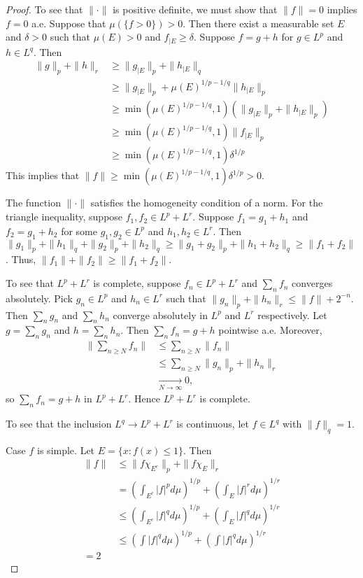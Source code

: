 \documentclass{article}
\begin{document}
\begin{proof}
To see that $\|\cdot\|$ is positive definite, we must show that $\|f\| = 0$ implies $f = 0$ a.e.  Suppose that $\mu(\{f > 0\}) > 0$.  Then there exist a measurable set $E$ and $\delta > 0$ such that $\mu(E) > 0$ and $f_{|E} \ge \delta$. Suppose $f = g + h$ for $g \in L^p$ and $h \in L^q$.  Then 
\begin{align*}
\|g\|_p + \|h\|_r &  \ge \|g_{|E}\|_p + \|h_{|E}\|_q 
\\ &  \ge \|g_{|E}\|_p + \mu(E)^{1/p - 1/q}\|h_{|E}\|_p
\\ & \ge \min(\mu(E)^{1/p - 1/q},1) (\|g_{|E}\|_p + \|h_{|E}\|_p)
\\ & \ge \min(\mu(E)^{1/p - 1/q},1) \|f_{|E}\|_p
\\  & \ge \min(\mu(E)^{1/p - 1/q},1) \delta^{1/p}
\end{align*}
This implies that $\|f\| \ge \min(\mu(E)^{1/p - 1/q},1) \delta^{1/p} > 0$.

The function $\|\cdot\|$ satisfies the homogeneity condition of a norm.  For the triangle inequality, suppose $f_1, f_2 \in L^p + L^r$.  Suppose $f_1 = g_1 + h_1$ and $f_2 = g_1 + h_2$ for some $g_1,g_2 \in L^p$ and $h_1, h_2 \in L^r$. Then $\|g_1\|_p + \|h_1\|_q +  \|g_2\|_p + \|h_2\|_q \ge \|g_1 + g_2\|_p + \|h_1 + h_2\|_q \ge \|f_1 +f_2\|$.  Thus, $\|f_1\| + \|f_2\| \ge \|f_1 + f_2\|$.

To see that $L^p + L^r$ is complete, suppose $f_n \in L^p + L^r$ and $\sum_n f_n$ converges absolutely. Pick $g_n \in L^p$ and $h_n \in L^r$ such that $\|g_n\|_p + \|h_n\|_r \le \|f\| + 2^{-n}$.  Then $\sum_n g_n$ and $\sum_n h_n$ converge absolutely in $L^p$ and $L^r$ respectively.  Let $g = \sum_n g_n$ and $h = \sum_n h_n$. Then $\sum_n f_n = g + h$ pointwise a.e.  Moreover, 
\begin{align*}
\| \sum_{n \ge N} f_n \|  & \le \sum_{n \ge N} \|f_n\|
\\ & \le \sum_{n \ge N} \|g_n\|_p + \|h_n\|_r
\\ & \underset{N \to \infty}{\to} 0,
\end{align*}
so $\sum_n f_n = g+ h$ in $L^p + L^r$.  Hence $L^p + L^r$ is complete.

To see that the inclusion $L^q \to L^p + L^r$ is continuous, let $f \in L^q$ with $\|f\|_q = 1$. 

Case $f$ is simple. Let $E = \{x : f(x) \le 1\}$. Then 
\begin{align*}
\|f\| & \le \|f \chi_{E^c}\|_p + \|f \chi_E\|_r 
\\ & =  \left( \int_{E^c} |f|^p d\mu \right)^{1/p} + \left( \int_{E} |f|^r d\mu \right)^{1/r}
\\ & \le \left( \int_{E^c} |f|^q d\mu \right)^{1/p} + \left( \int_{E} |f|^q d\mu \right)^{1/r}
\\ & \le \left( \int |f|^q d\mu \right)^{1/p} + \left( \int |f|^q d\mu \right)^{1/r}
\\ = 2
\end{align*}


\end{proof}
\end{document}
